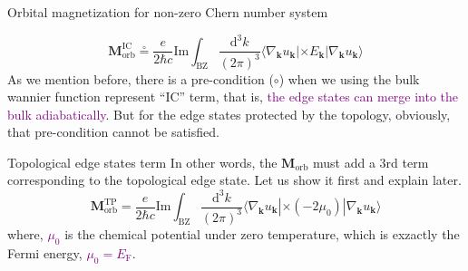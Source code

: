 \documentclass{beamer}
\newcommand{\purple}{\textcolor{purple}}
\begin{document}
    \begin{frame}{Orbital magnetization for non-zero Chern number system}
      \begin{block}{}
        \begin{equation*}
          \bm{M}_{\text{orb}}^{\text{IC}} \overset{\circ}{=} \frac{e}{2\hbar{}c}\text{Im}\int_{\text{BZ}}\frac{\mathrm{d}^3k}{(2\pi)^3}\langle\nabla_{\bm{k}}u_{\bm{k}}|\times{}E_{\bm{k}}|\nabla_{\bm{k}}u_{\bm{k}}\rangle
        \end{equation*}
        As we mention before, there is a pre-condition (\(\circ\)) when we using the bulk wannier function represent ``IC'' term, that is, \purple{the edge states can merge into the bulk adiabatically}. But for the edge states protected by the topology, obviously, that pre-condition cannot be satisfied.
      \end{block}
      \begin{block}{Topological edge states term}
        In other words, the \(\bm{M}_{\text{orb}}\) must add a 3rd term corresponding to the topological edge state. Let us show it first and explain later.
        \begin{equation}
          \bm{M}_{\text{orb}}^{\text{TP}} = \frac{e}{2\hbar{}c}\text{Im}\int_{\text{BZ}}\frac{\mathrm{d}^3k}{(2\pi)^3}\langle\nabla_{\bm{k}}u_{\bm{k}}|\times(-2\mu_{0})|\nabla_{\bm{k}}u_{\bm{k}}\rangle
        \end{equation}
        where, \purple{\(\mu_{0}\)} is the chemical potential under zero temperature, which is exzactly the Fermi energy, \purple{\(\mu_{0} = E_{\text{F}}\)}.
      \end{block}
    \end{frame}
\end{document}
